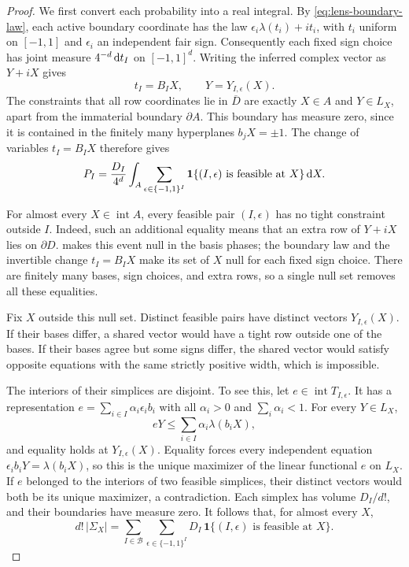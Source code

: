 \begin{proof}
We first convert each probability into a real integral. By \eqref{eq:lens-boundary-law}, each active boundary coordinate has the law $\epsilon_i\lambda(t_i)+it_i$, with $t_i$ uniform on $[-1,1]$ and $\epsilon_i$ an independent fair sign. Consequently each fixed sign choice has joint measure $4^{-d}\,\mathrm{d} t_I$ on $[-1,1]^d$. Writing the inferred complex vector as $Y+iX$ gives
\[
 t_I=B_IX,\qquad Y=Y_{I,\epsilon}(X).
\]
The constraints that all row coordinates lie in $\overline D$ are exactly $X\in A$ and $Y\in L_X$, apart from the immaterial boundary $\partial A$. This boundary has measure zero, since it is contained in the finitely many hyperplanes $b_jX=\pm1$. The change of variables $t_I=B_IX$ therefore gives
\begin{equation}\label{eq:probability-real-integral}
 P_I=\frac{D_I}{4^d}\int_A
       \sum_{\epsilon\in\{-1,1\}^I}
         \mathbf1\{(I,\epsilon)\text{ is feasible at }X\}\,\mathrm{d} X.
\end{equation}

For almost every $X\in\operatorname{int}A$, every feasible pair $(I,\epsilon)$ has no tight constraint outside $I$. Indeed, such an additional equality means that an extra row of $Y+iX$ lies on $\partial D$.  makes this event null in the basis phases; the boundary law and the invertible change $t_I=B_IX$ make its set of $X$ null for each fixed sign choice. There are finitely many bases, sign choices, and extra rows, so a single null set removes all these equalities.

Fix $X$ outside this null set. Distinct feasible pairs have distinct vectors $Y_{I,\epsilon}(X)$. If their bases differ, a shared vector would have a tight row outside one of the bases. If their bases agree but some signs differ, the shared vector would satisfy opposite equations with the same strictly positive width, which is impossible.

The interiors of their simplices are disjoint. To see this, let $e\in\operatorname{int}T_{I,\epsilon}$. It has a representation $e=\sum_{i\in I}\alpha_i\epsilon_i b_i$ with all $\alpha_i>0$ and $\sum_i\alpha_i<1$. For every $Y\in L_X$,
\[
 eY\leq\sum_{i\in I}\alpha_i\lambda(b_iX),
\]
and equality holds at $Y_{I,\epsilon}(X)$. Equality forces every independent equation $\epsilon_i b_iY=\lambda(b_iX)$, so this is the unique maximizer of the linear functional $e$ on $L_X$. If $e$ belonged to the interiors of two feasible simplices, their distinct vectors would both be its unique maximizer, a contradiction. Each simplex has volume $D_I/d!$, and their boundaries have measure zero. It follows that, for almost every $X$,
\begin{equation}\label{eq:simplex-volume-sum}
 d!\,|\Sigma_X|
      =\sum_{I\in\mathcal{B}}\sum_{\epsilon\in\{-1,1\}^I}
               D_I\,\mathbf1\{(I,\epsilon)\text{ is feasible at }X\}.
\end{equation}


\end{proof}
